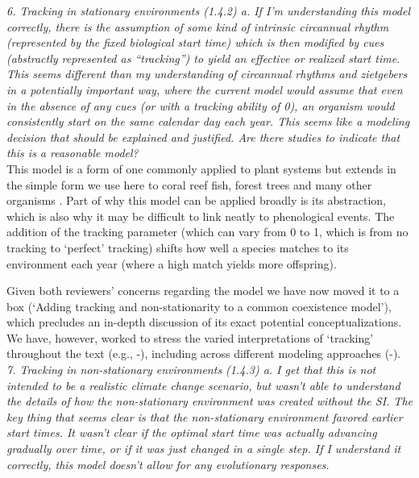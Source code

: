 \documentclass[11pt]{article}
\begin{document}
\emph{6.      Tracking in stationary environments (1.4.2)
a.      If I'm understanding this model correctly, there is the assumption of some kind of
intrinsic circannual rhythm (represented by the fixed biological start time) which is then
modified by cues (abstractly represented as ``tracking'') to yield an effective or realized start time. This seems different than my understanding of circannual rhythms and zietgebers %
in a potentially important way, where the current model would assume that even in the absence
of any cues (or with a tracking ability of 0), an organism would consistently start on the
same calendar day each year. This seems like a modeling decision that should be explained and
justified. Are there studies to indicate that this is a reasonable model?}\\

This model is a form of one commonly applied to plant systems but extends in the simple form we use here to coral reef fish, forest trees and many other organisms \citep[see][]{Chesson:1997dz}. Part of why this model can be applied broadly is its abstraction, which is also why it may be difficult to link neatly to phenological events. The addition of the tracking parameter (which can vary from 0 to 1, which is from no tracking to `perfect' tracking) shifts how well a species matches to its environment each year (where a high match yields more offspring). 

Given both reviewers' concerns regarding the model we have now moved it to a box (`Adding tracking and non-stationarity to a common coexistence model'), which precludes an in-depth discussion of its exact potential conceptualizations. We have, however, worked to stress the varied interpretations of `tracking' throughout the text (e.g., -), including across different modeling approaches (-).\\

\emph{7.      Tracking in non-stationary environments (1.4.3)
a.      I get that this is not intended to be a realistic climate change scenario, but wasn't
able to understand the details of how the non-stationary environment was created without the
SI. The key thing that seems clear is that the non-stationary environment favored earlier
start times. It wasn't clear if the optimal start time was actually advancing gradually over
time, or if it was just changed in a single step. If I understand it correctly, this model
doesn't allow for any evolutionary responses.}\\
\end{document}
